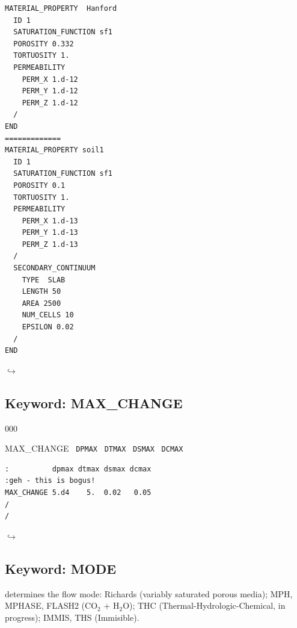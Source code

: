 \documentclass[12pt]{article}
\newcommand\return{{\hfill$\hookrightarrow$}}
\begin{document}

\begin{verbatim}
MATERIAL_PROPERTY  Hanford
  ID 1
  SATURATION_FUNCTION sf1
  POROSITY 0.332
  TORTUOSITY 1.
  PERMEABILITY
    PERM_X 1.d-12
    PERM_Y 1.d-12
    PERM_Z 1.d-12
  /
END
=============
MATERIAL_PROPERTY soil1
  ID 1 
  SATURATION_FUNCTION sf1
  POROSITY 0.1
  TORTUOSITY 1.
  PERMEABILITY
    PERM_X 1.d-13
    PERM_Y 1.d-13
    PERM_Z 1.d-13
  /
  SECONDARY_CONTINUUM
    TYPE  SLAB
    LENGTH 50
    AREA 2500
    NUM_CELLS 10
    EPSILON 0.02
  /
END
\end{verbatim}

\hyperlink{target_key}{\return}


\newpage
\protect\hypertarget{target_max}{}

\subsection{Keyword: MAX\_CHANGE}


\begin{deflist}{000}
\item[MAX\_CHANGE] \ {\tt DPMAX} \ {\tt DTMAX} \ {\tt DSMAX} \ {\tt DCMAX}
\end{deflist}


\begin{verbatim}
:          dpmax dtmax dsmax dcmax
:geh - this is bogus!
MAX_CHANGE 5.d4    5.  0.02   0.05
/
/
\end{verbatim}

\hyperlink{target_key}{\return}


\newpage
\protect\hypertarget{target_mode}{}

\subsection{Keyword: MODE}

 determines the flow mode: Richards (variably saturated porous media); MPH, \linebreak MPHASE, FLASH2 (CO$_2$ + H$_2$O); THC (Thermal-Hydrologic-Chemical, in pro\-gress); IMMIS, THS (Immisible).
\end{document}
